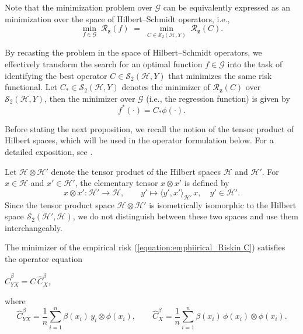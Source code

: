 \documentclass[twoside,11pt]{article}
\begin{document}
\noindent
Note that the minimization problem over $\mathcal{G}$ can be equivalently 
expressed as an minimization over the space of Hilbert--Schmidt operators, i.e.,
\vspace{0.3em}
\[
\min_{f \in \mathcal{G}} \; \mathcal{R}_{\mathbf z}(f)
\;=\;
\min_{C \in \mathcal{S}_2(\mathcal{H},Y)} \; \mathcal{R}_{\mathbf z}(C).
\]




By recasting the problem in the space of Hilbert--Schmidt operators, 
we effectively transform the search for an optimal function 
$f \in \mathcal{G}$ into the task of identifying the best operator 
$C \in \mathcal S_2(\mathcal{H}, {Y})$ that minimizes the same risk functional. Let $C_* \in \mathcal S_2(\mathcal{H},Y)$ denotes the minimizer of $\mathcal{R}_{\mathbf z}(C)$ over $\mathcal S_2(\mathcal{H},Y)$, then the minimizer over $\mathcal{G}$ (i.e., the regression function) is given by
\[
f^\ast(\cdot)=C_* \phi(\cdot).
\]
  
\noindent
Before stating the next proposition, we recall the notion of the tensor product of Hilbert spaces, 
which will be used in the operator formulation below. 
For a detailed exposition, see \cite{aubin}.

\medskip

Let $\mathcal H \otimes \mathcal{H'}$ denote the tensor product of the Hilbert spaces $\mathcal H$ and $\mathcal H'$.
 For $x \in \mathcal H$ and $x' \in \mathcal H'$, the elementary tensor $x \otimes x'$ is defined by
\[
x \otimes x' : \mathcal H' \to \mathcal H, 
\qquad 
y' \mapsto \langle y', x' \rangle_{\mathcal H'}\, x, 
\quad y' \in \mathcal H'.
\]
Since the tensor product space $\mathcal H \otimes \mathcal H'$ is isometrically isomorphic to the Hilbert space 
$\mathcal{S}_2(\mathcal H', \mathcal H)$, 
we do not distinguish between these two spaces and use them interchangeably.


\medskip


\begin{proposition}    

The minimizer of the empirical risk (\ref{equation:emphiirical_Riskin C}) satisfies the operator equation
\begin{center}
    $\widehat{C}_{YX}^\beta = C \, \widehat{C}_{X}^\beta,$
\end{center}
where
\[
\widehat{C}_{YX}^\beta = \frac{1}{n}\sum_{i=1}^n \beta(x_i) \, y_i \otimes \phi(x_i),
    \qquad
\widehat{C}_{X}^\beta = \frac{1}{n}\sum_{i=1}^n \beta(x_i) \, \phi(x_i) \otimes \phi(x_i).
\]
\end{proposition}
\noindent
\end{document}
